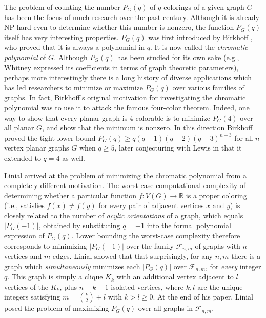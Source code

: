 \documentclass[11pt]{article}
\begin{document}
The problem of counting the number $P_G(q)$ of $q$-colorings of a
given graph $G$ has been the focus of much research over the past
century.  Although it is already NP-hard even to determine whether
this number is nonzero, the function $P_G(q)$ itself has very
interesting properties.  $P_G(q)$ was first introduced by Birkhoff
\cite{Birkhoff-1912}, who proved that it is always a polynomial in
$q$.  It is now called the \emph{chromatic polynomial}\/ of $G$.
Although $P_G(q)$ has been studied for its own sake (e.g., Whitney
\cite{Whitney} expressed its coefficients in terms of graph theoretic
parameters), perhaps more interestingly there is a long history of
diverse applications which has led researchers to minimize or maximize
$P_G(q)$ over various families of graphs.  In fact, Birkhoff's
original motivation for investigating the chromatic polynomial was to
use it to attack the famous four-color theorem.  Indeed, one way to
show that every planar graph is 4-colorable is to minimize $P_G(4)$
over all planar $G$, and show that the minimum is nonzero.  In this
direction Birkhoff \cite{Birkhoff-1930} proved the tight lower bound
$P_G(q) \geq q(q-1)(q-2)(q-3)^{n-3}$ for all $n$-vertex planar graphs
$G$ when $q \geq 5$, later conjecturing with Lewis in
\cite{Birkhoff-Lewis-1946} that it extended to $q=4$ as well.

Linial \cite{Linial} arrived at the problem of minimizing the
chromatic polynomial from a completely different motivation.  The
worst-case computational complexity of determining whether a
particular function $f : V(G) \rightarrow \mathbb{R}$ is a proper
coloring (i.e., satisfies $f(x) \neq f(y)$ for every pair of adjacent
vertices $x$ and $y$) is closely related to the number of \emph{acylic
  orientations}\/ of a graph, which equals $|P_G(-1)|$, obtained by
substituting $q = -1$ into the formal polynomial expression of
$P_G(q)$.
Lower bounding the worst-case complexity therefore corresponds to
minimizing $|P_G(-1)|$ over the family $\mathcal{F}_{n,m}$ of graphs
with $n$ vertices and $m$ edges.  Linial showed that that
surprisingly, for any $n,m$ there is a graph which
\emph{simultaneously}\/ minimizes each $|P_G(q)|$ over
$\mathcal{F}_{n,m}$, for \emph{every}\/ integer $q$.  This graph is
simply a clique $K_k$ with an additional vertex adjacent to $l$
vertices of the $K_k$, plus $n-k-1$ isolated vertices, where $k,l$ are
the unique integers satisfying $m = {k \choose 2} + l$ with $k > l
\geq 0$.  At the end of his paper, Linial posed the problem of
maximizing $P_G(q)$ over all graphs in $\mathcal{F}_{n,m}$.
\end{document}
